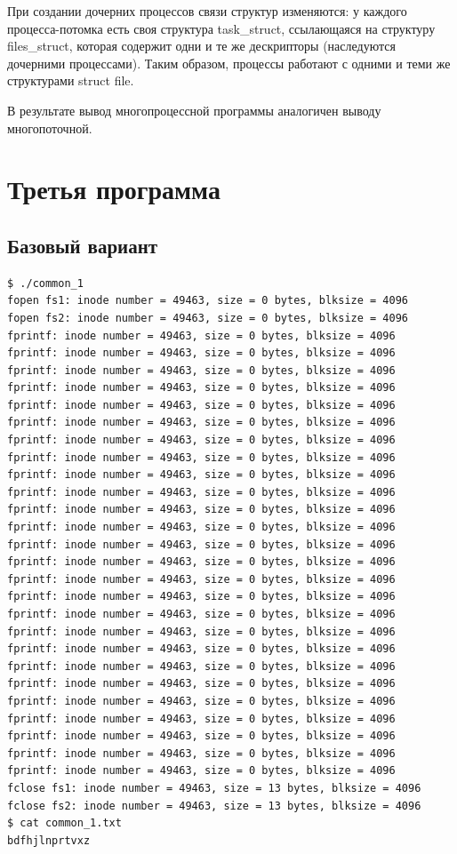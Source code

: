 \documentclass[a4paper,14pt]{extarticle}
\begin{document}
При создании дочерних процессов связи структур изменяются: у каждого процесса-потомка есть своя структура task\_struct, ссылающаяся на структуру files\_struct, которая содержит одни и те же дескрипторы (наследуются дочерними процессами). Таким образом, процессы работают с одними и теми же структурами struct file.

В результате вывод многопроцессной программы аналогичен выводу многопоточной.



\section{Третья программа}

\subsection{Базовый вариант}



\begin{lstlisting}[caption={\text{Вывод программы}}]
$ ./common_1
fopen fs1: inode number = 49463, size = 0 bytes, blksize = 4096
fopen fs2: inode number = 49463, size = 0 bytes, blksize = 4096
fprintf: inode number = 49463, size = 0 bytes, blksize = 4096
fprintf: inode number = 49463, size = 0 bytes, blksize = 4096
fprintf: inode number = 49463, size = 0 bytes, blksize = 4096
fprintf: inode number = 49463, size = 0 bytes, blksize = 4096
fprintf: inode number = 49463, size = 0 bytes, blksize = 4096
fprintf: inode number = 49463, size = 0 bytes, blksize = 4096
fprintf: inode number = 49463, size = 0 bytes, blksize = 4096
fprintf: inode number = 49463, size = 0 bytes, blksize = 4096
fprintf: inode number = 49463, size = 0 bytes, blksize = 4096
fprintf: inode number = 49463, size = 0 bytes, blksize = 4096
fprintf: inode number = 49463, size = 0 bytes, blksize = 4096
fprintf: inode number = 49463, size = 0 bytes, blksize = 4096
fprintf: inode number = 49463, size = 0 bytes, blksize = 4096
fprintf: inode number = 49463, size = 0 bytes, blksize = 4096
fprintf: inode number = 49463, size = 0 bytes, blksize = 4096
fprintf: inode number = 49463, size = 0 bytes, blksize = 4096
fprintf: inode number = 49463, size = 0 bytes, blksize = 4096
fprintf: inode number = 49463, size = 0 bytes, blksize = 4096
fprintf: inode number = 49463, size = 0 bytes, blksize = 4096
fprintf: inode number = 49463, size = 0 bytes, blksize = 4096
fprintf: inode number = 49463, size = 0 bytes, blksize = 4096
fprintf: inode number = 49463, size = 0 bytes, blksize = 4096
fprintf: inode number = 49463, size = 0 bytes, blksize = 4096
fprintf: inode number = 49463, size = 0 bytes, blksize = 4096
fprintf: inode number = 49463, size = 0 bytes, blksize = 4096
fprintf: inode number = 49463, size = 0 bytes, blksize = 4096
fclose fs1: inode number = 49463, size = 13 bytes, blksize = 4096
fclose fs2: inode number = 49463, size = 13 bytes, blksize = 4096
$ cat common_1.txt
bdfhjlnprtvxz
\end{lstlisting}
\end{document}
